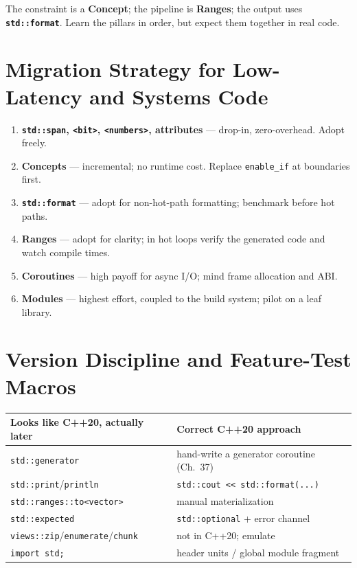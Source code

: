 The constraint is a \textbf{Concept}; the pipeline is \textbf{Ranges}; the output uses \textbf{\texttt{std::format}}. Learn the pillars in order, but expect them together in real code.

\section{Migration Strategy for Low-Latency and Systems Code}
\label{sec:c20-migration}

\begin{enumerate}
\item \textbf{\texttt{std::span}, \texttt{<bit>}, \texttt{<numbers>}, attributes} --- drop-in, zero-overhead. Adopt freely.
\item \textbf{Concepts} --- incremental; no runtime cost. Replace \texttt{enable\_if} at boundaries first.
\item \textbf{\texttt{std::format}} --- adopt for non-hot-path formatting; benchmark before hot paths.
\item \textbf{Ranges} --- adopt for clarity; in hot loops verify the generated code and watch compile times.
\item \textbf{Coroutines} --- high payoff for async I/O; mind frame allocation and ABI.
\item \textbf{Modules} --- highest effort, coupled to the build system; pilot on a leaf library.
\end{enumerate}

\section{Version Discipline and Feature-Test Macros}
\label{sec:c20-version}

\begin{center}
\begin{tabular}{ll}
\hline
\textbf{Looks like C++20, actually later} & \textbf{Correct C++20 approach} \\
\hline
\texttt{std::generator} & hand-write a generator coroutine (Ch.~37) \\
\texttt{std::print}/\texttt{println} & \texttt{std::cout << std::format(...)} \\
\texttt{std::ranges::to<vector>} & manual materialization \\
\texttt{std::expected} & \texttt{std::optional} + error channel \\
\texttt{views::zip}/\texttt{enumerate}/\texttt{chunk} & not in C++20; emulate \\
\texttt{import std;} & header units / global module fragment \\
\hline
\end{tabular}
\end{center}

